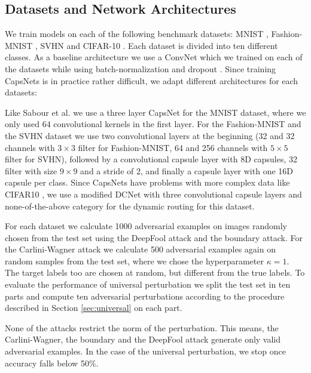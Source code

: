 \documentclass{article}
\begin{document}
\subsection{Datasets and Network Architectures}

We train models on each of the following benchmark datasets: MNIST \cite{mnist}, Fashion-MNIST \cite{fashion}, SVHN \cite{svhn} and CIFAR-10 \cite{cifar}. Each dataset is divided into ten different classes. As a baseline architecture we use a ConvNet which we trained on each of the datasets while using batch-normalization \cite{batchnorm} and dropout \cite{dropout}. Since training CapsNets is in practice rather difficult, we adapt different architectures for each datasets:

Like Sabour et al.  we use a three layer CapsNet for the MNIST dataset, where we only used $64$ convolutional kernels in the first layer. For the Fashion-MNIST and the SVHN dataset we use two convolutional layers at the beginning (32 and 32 channels with $3\times3$ filter for Fashion-MNIST, 64 and 256 channels with $5\times5$ filter for SVHN), followed by a convolutional capsule layer with 8D capsules, 32 filter with size $9\times9$ and a stride of 2, and finally a capsule layer with one 16D capsule per class. Since CapsNets have problems with more complex data like CIFAR10 \cite{complex}, we use a modified DCNet \cite{denseanddiverse} with three convolutional capsule layers and none-of-the-above category for the dynamic routing \cite{capsules} for this dataset.

For each dataset we calculate 1000 adversarial examples on images randomly chosen from the test set using the DeepFool attack and the boundary attack.
For the Carlini-Wagner attack we calculate 500 adversarial examples again on random samples from the test set, where we chose the hyperparameter $\kappa = 1$. The target labels too are chosen at random, but different from the true labels. To evaluate the performance of universal perturbation we split the test set in ten parts and compute ten adversarial perturbations according to the procedure described in Section \ref{sec:universal} on each part.

None of the attacks restrict the norm of the perturbation. This means, the Carlini-Wagner, the boundary and the DeepFool attack generate only valid adversarial examples. In the case of the universal perturbation, we stop once accuracy falls below 50\%.

\end{document}
